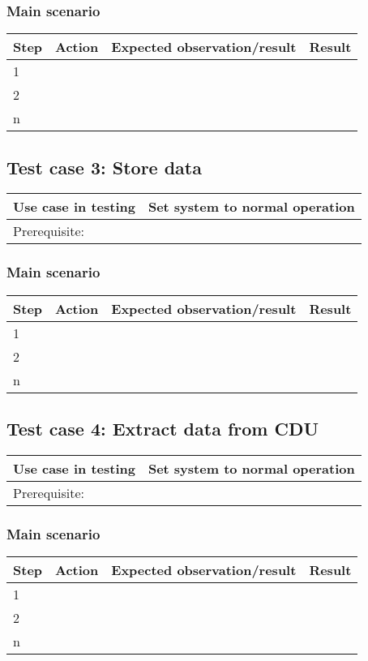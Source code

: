 \subsubsection{Main scenario}
\begin{table}[H]
    \begin{tabular}{|l|l|l|l|}
    \hline
    Step & Action & Expected observation/result & Result \\ \hline
    1 & ~ & ~ & ~ \\ \hline
    2 & ~ & ~ & ~ \\ \hline
    n & ~ & ~ & ~ \\ \hline
    \end{tabular}
\end{table}

\subsection{Test case 3: Store data}
\begin{table}[H]
    \begin{tabular}{|l|l|}
    \hline
    Use case in testing & Set system to normal operation \\ \hline
    Prerequisite: & ~ \\ \hline
    \end{tabular}
\end{table}

\subsubsection{Main scenario}
\begin{table}[H]
    \begin{tabular}{|l|l|l|l|}
    \hline
    Step & Action & Expected observation/result & Result \\ \hline
    1 & ~ & ~ & ~ \\ \hline
    2 & ~ & ~ & ~ \\ \hline
    n & ~ & ~ & ~ \\ \hline
    \end{tabular}
\end{table}

\subsection{Test case 4: Extract data from CDU}
\begin{table}[H]
    \begin{tabular}{|l|l|}
    \hline
    Use case in testing & Set system to normal operation \\ \hline
    Prerequisite: & ~ \\ \hline
    \end{tabular}
\end{table}

\subsubsection{Main scenario}
\begin{table}[H]
    \begin{tabular}{|l|l|l|l|}
    \hline
    Step & Action & Expected observation/result & Result \\ \hline
    1 & ~ & ~ & ~ \\ \hline
    2 & ~ & ~ & ~ \\ \hline
    n & ~ & ~ & ~ \\ \hline
    \end{tabular}
\end{table}
